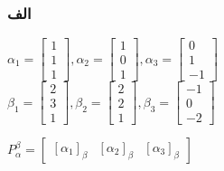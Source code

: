 \subsubsection*{الف}
\setLTR
$
\alpha_1 = 
\begin{bmatrix}
	1 \\
	1 \\
	1
\end{bmatrix} , \alpha_2 =
\begin{bmatrix}
	1 \\
	0 \\
	1
\end{bmatrix} , \alpha_3 =
\begin{bmatrix}
	0 \\
	1 \\
	-1
\end{bmatrix}  \qquad \qquad \qquad \qquad
$
$
\beta_1 = 
\begin{bmatrix}
	2 \\
	3 \\
	1
\end{bmatrix} , \beta_2 =
\begin{bmatrix}
	2 \\
	2 \\
	1
\end{bmatrix} , \beta_3 =
\begin{bmatrix}
	-1 \\
	0 \\
	-2
\end{bmatrix} 
$

$P^\beta_\alpha = 
\begin{bmatrix}
	[\alpha_1]_\beta & [\alpha_2]_\beta & [\alpha_3]_\beta
\end{bmatrix} 
$

